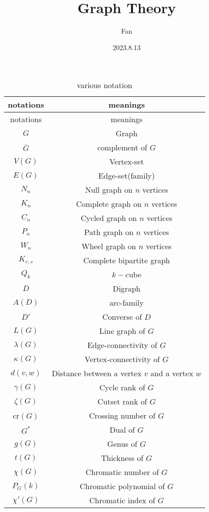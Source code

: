\documentclass[a4paper,11pt]{article}%
\author{Fan}
\title{Graph Theory}
\date{2023.8.13}
\theoremstyle{remark}
\theoremstyle{definition}
\theoremstyle{definition}
\theoremstyle{definition}
\theoremstyle{definition}
\theoremstyle{plain}
\theoremstyle{definition}
\begin{document}
\maketitle
\tableofcontents
\pagestyle{plain}%
\begin{longtable}{cc}
        \caption{various notation} \\
       \multicolumn{1}{c}{notations}&\multicolumn{1}{c}{meanings}\\
       \hline
       \endfirsthead
       \multicolumn{1}{c}{notations}&\multicolumn{1}{c}{meanings}\\
       \hline\endhead
       $G$ & Graph\\
       $\bar{G}$&complement of $G$\\
       $V(G)$& Vertex-set\\
       $E(G)$ & Edge-set(family)\\
       $N_n$& Null graph on $n$ vertices \\
       $K_n$& Complete graph on $n$ vertices \\
       $C_n$& Cycled graph on $n$ vertices \\
       $P_n$& Path graph on $n$ vertices \\
       $W_n$& Wheel graph on $n$ vertices \\
       $K_{r,s}$&Complete bipartite graph\\ 
       $Q_k$& $k-$cube\\
       $D$& Digraph\\
       $A(D)$& arc-family\\
       $D'$& Converse of $D$\\
       $L(G)$&Line graph of $G$\\
       $\lambda(G)$&Edge-connectivity of $G$\\
       $\kappa(G)$& Vertex-connectivity of $G$\\
       $d(v,w)$&Distance between a vertex $v$ and a vertex $w$\\
       $\gamma(G)$&Cycle rank of $G$\\
       $\zeta(G)$&Cutset rank of $G$\\
       cr$(G)$&Crossing number of $G$\\
       $G^*$&Dual of $G$\\
       $g(G)$& Genus of $G$\\
       $t(G)$&Thickness of $G$\\
       $\chi (G)$&Chromatic number of $G$\\
       $P_G(k)$&Chromatic polynomial of $G$\\
       $\chi'(G)$&Chromatic index of $G$\\
\end{longtable}
\newpage 
\end{document}
